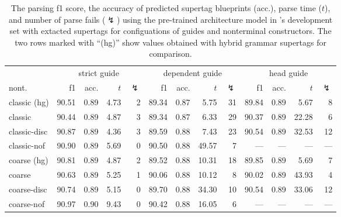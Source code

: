 \documentclass[../../document.tex]{subfiles}
\begin{document}
    \begin{table}
        \caption{\label{tbl:gridsearch:dcp:3}
        The parsing f1 score, the accuracy of predicted supertag blueprints (acc.), parse time ($t$), and number of parse fails ($\lightning$) using the pre-trained architecture model in \negra{}'s development set with extacted  supertags for configuations of guides and nonterminal constructors. The two rows marked with ``(hg)'' show values obtained with hybrid grammar supertags for comparison.
        }
        \centering
        \setlength{\tabcolsep}{5pt}
        \vspace{.2cm}
        \begin{tabular}{l|rrrr|rrrr|rrrr}
            \toprule
            & \multicolumn{4}{c|}{strict guide} &  \multicolumn{4}{c|}{dependent guide} &  \multicolumn{4}{c}{head guide} \\
nont.           & f1 & acc. & $t$ & $\lightning$ & f1 & acc. & $t$ & $\lightning$ & f1 & acc. & $t$ & $\lightning$  \\ \hline
\rowcolor{black!10}
classic (hg) & 90.51 & 0.89 & 4.73 & 2 & 89.34 & 0.87 &  5.75 & 31 & 89.84 & 0.89 &  5.67 & 8 \\\hline
classic      & 90.44 & 0.89 & 4.87 & 3 & 89.34 & 0.87 &  6.33 & 29 & 90.37 & 0.89 & 22.28 & 6 \\
classic-disc & 90.87 & 0.89 & 4.36 & 3 & 89.59 & 0.88 &  7.43 & 23 & 90.54 & 0.89 & 32.53 & 12 \\
classic-nof  & 90.90 & 0.89 & 5.69 & 0 & 90.50 & 0.88 & 49.57 &  7 &   --- &  --- &   --- & --- \\ \hline
\rowcolor{black!10}
coarse (hg) & 90.81 & 0.89 & 4.87 & 2 & 89.52 & 0.88 & 10.31 & 18 & 89.85 & 0.89 &  5.69 & 7 \\ \hline
coarse      & 90.63 & 0.89 & 5.25 & 1 & 90.06 & 0.88 & 10.12 &  8 & 90.02 & 0.89 & 43.93 & 4 \\
coarse-disc & 90.74 & 0.89 & 5.15 & 0 & 89.70 & 0.88 & 34.30 & 10 & 90.54 & 0.89 & 33.06 & 12 \\
coarse-nof  & 90.97 & 0.90 & 9.43 & 0 & 90.42 & 0.88 & 16.05 &  6 &   --- &  --- &   --- & --- \\
\bottomrule
        \end{tabular}
    \end{table}
\end{document}
